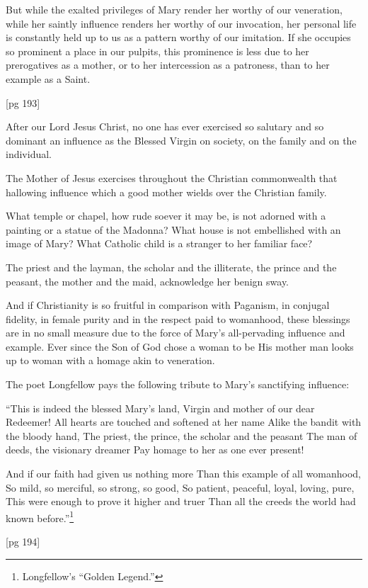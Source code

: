 But while the exalted privileges of Mary render
her worthy of our veneration, while her saintly
influence renders her worthy of our invocation,
her personal life is constantly held up to us as
a pattern worthy of our imitation. If she occupies
so prominent a place in our pulpits, this
prominence is less due to her prerogatives as a
mother, or to her intercession as a patroness, than
to her example as a Saint.

[pg 193]

After our Lord Jesus Christ, no one has ever
exercised so salutary and so dominant an influence
as the Blessed Virgin on society, on the
family and on the individual.

The Mother of Jesus exercises throughout the
Christian commonwealth that hallowing influence
which a good mother wields over the Christian
family.

What temple or chapel, how rude soever it may
be, is not adorned with a painting or a statue of
the Madonna? What house is not embellished
with an image of Mary? What Catholic child is
a stranger to her familiar face?

The priest and the layman, the scholar and the
illiterate, the prince and the peasant, the mother
and the maid, acknowledge her benign sway.

And if Christianity is so fruitful in comparison
with Paganism, in conjugal fidelity, in female purity
and in the respect paid to womanhood, these
blessings are in no small measure due to the force
of Mary's all-pervading influence and example.
Ever since the Son of God chose a woman to be
His mother man looks up to woman with a homage
akin to veneration.

The poet Longfellow pays the following tribute
to Mary's sanctifying influence:

“This is indeed the blessed Mary's land,
Virgin and mother of our dear Redeemer!
All hearts are touched and softened at her name
Alike the bandit with the bloody hand,
The priest, the prince, the scholar and the peasant
The man of deeds, the visionary dreamer
Pay homage to her as one ever present!

And if our faith had given us nothing more
Than this example of all womanhood,
So mild, so merciful, so strong, so good,
So patient, peaceful, loyal, loving, pure,
This were enough to prove it higher and truer
Than all the creeds the world had known
before.”\footnote{Longfellow's “Golden Legend.”}

[pg 194]

